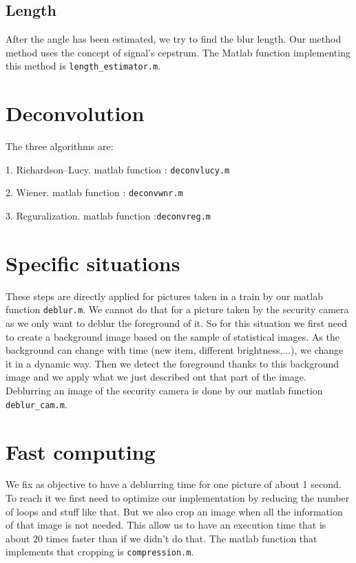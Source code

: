 \subsection{Length}
After the angle has been estimated, we try to find the blur length. Our method method uses the concept of signal's cepstrum. The Matlab function implementing this method is \verb|length_estimator.m|. 

\section{Deconvolution}
The three algorithms are:

1. Richardson–Lucy. matlab function : \texttt{deconvlucy.m}

2. Wiener. matlab function : \texttt{deconvwnr.m}

3. Reguralization. matlab function :\texttt{deconvreg.m}

\section{Specific situations}

These steps are directly applied for pictures taken in a train by our matlab function \texttt{deblur.m}. We cannot do that for a picture taken by the security camera as we only want to deblur the foreground of it. So for this situation we first need to create a background image based on the sample of statistical images. As the background can change with time (new item, different brightness,...), we change it in a dynamic way. Then we detect the foreground thanks to this background image and we apply what we just described ont that part of the image. Deblurring an image of the security camera is done by our matlab function \texttt{deblur\_cam.m}.

\section{Fast computing}

We fix as objective to have a deblurring time for one picture of about 1 second. To reach it we first need to optimize our implementation by reducing the number of loops and stuff like that. But we also crop an image when all the information of that image is not needed. This allow us to have an execution time that is about $20$ times faster than if we didn't do that. The matlab function that implements that cropping is \texttt{compression.m}.